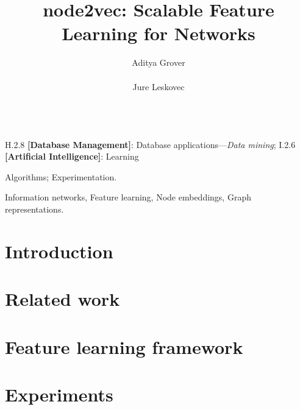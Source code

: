 \documentclass{sig-alternate}
\begin{document}
\title{node2vec: Scalable Feature Learning for Networks}

\author{
\alignauthor
Aditya Grover\\
      \\
\alignauthor Jure Leskovec\\
      \\
}


\maketitle

\begin{abstract}

\end{abstract}

\vspace{1mm}
 H.2.8 {\bf [Database Management]}: Database applications---{\it Data mining}; I.2.6 {\bf [Artificial Intelligence]}: Learning

 Algorithms; Experimentation.

 Information networks, Feature learning, Node embeddings, Graph representations.

\section{Introduction}
\label{sec:intro}


\section{Related work}
\label{sec:related}


\section{Feature learning framework}
\label{sec:proposed}


\section{Experiments}
\label{sec:experiments}

\end{document}
